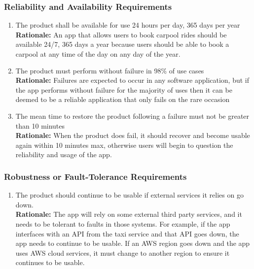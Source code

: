 \documentclass[]{article}
\begin{document}
\subsubsection{Reliability and Availability Requirements}
\label{ssub:reliability_and_availability_requirements}
\begin{enumerate}[{PR-RA}1. ]
	\item The product shall be available for use 24 hours per day, 365 days per year \\
	{\bf Rationale:} An app that allows users to book carpool rides should be available 24/7, 365 days a year because users should be able to book a carpool at any time of the day on any day of the year.
	\item The product must perform without failure in 98\% of use cases \\
	{\bf Rationale:} Failures are expected to occur in any software application, but if the app performs without failure for the majority of uses then it can be deemed to be a reliable application that only fails on the rare occasion
	\item The mean time to restore the product following a failure must not be greater than 10 minutes \\
	{\bf Rationale:} When the product does fail, it should recover and become usable again within 10 minutes max, otherwise users will begin to question the reliability and usage of the app.
\end{enumerate}

\subsubsection{Robustness or Fault-Tolerance Requirements}
\label{ssub:robustness_or_fault_tolerance_requirements}
\begin{enumerate}[{PR-RFT}1. ]
	\item The product should continue to be usable if external services it relies on go down.\\
	{\bf Rationale:} The app will rely on some external third party services, and it needs to be tolerant to faults in those systems. For example, if the app interfaces with an API from the taxi service and that API goes down, the app needs to continue to be usable. If an AWS region goes down and the app uses AWS cloud services, it must change to another region to ensure it continues to be usable.
\end{enumerate}
\end{document}
